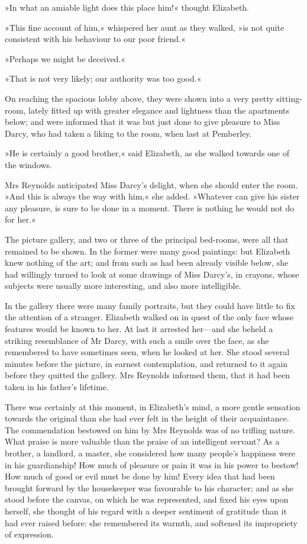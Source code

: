 »In what an amiable light does this place him!« thought Elizabeth.

»This fine account of him,« whispered her aunt as they walked, »is not quite consistent with his behaviour to our poor friend.«

»Perhaps we might be deceived.«

»That is not very likely; our authority was too good.«

On reaching the spacious lobby above, they were shown into a very pretty sitting-room, lately fitted up with greater elegance and lightness than the apartments below; and were informed that it was but just done to give pleasure to Miss Darcy, who had taken a liking to the room, when last at Pemberley.

»He is certainly a good brother,« said Elizabeth, as she walked towards one of the windows.

Mrs Reynolds anticipated Miss Darcy's delight, when she should enter the room. »And this is always the way with him,« she added. »Whatever can give his sister any pleasure, is sure to be done in a moment. There is nothing he would not do for her.«

The picture gallery, and two or three of the principal bed-rooms, were all that remained to be shown. In the former were many good paintings: but Elizabeth knew nothing of the art; and from such as had been already visible below, she had willingly turned to look at some drawings of Miss Darcy's, in crayons, whose subjects were usually more interesting, and also more intelligible.

In the gallery there were many family portraits, but they could have little to fix the attention of a stranger. Elizabeth walked on in quest of the only face whose features would be known to her. At last it arrested her—and she beheld a striking resemblance of Mr Darcy, with such a smile over the face, as she remembered to have sometimes seen, when he looked at her. She stood several minutes before the picture, in earnest contemplation, and returned to it again before they quitted the gallery. Mrs Reynolds informed them, that it had been taken in his father's lifetime.

There was certainly at this moment, in Elizabeth's mind, a more gentle sensation towards the original than she had ever felt in the height of their acquaintance. The commendation bestowed on him by Mrs Reynolds was of no trifling nature. What praise is more valuable than the praise of an intelligent servant? As a brother, a landlord, a master, she considered how many people's happiness were in his guardianship! How much of pleasure or pain it was in his power to bestow! How much of good or evil must be done by him! Every idea that had been brought forward by the housekeeper was favourable to his character; and as she stood before the canvas, on which he was represented, and fixed his eyes upon herself, she thought of his regard with a deeper sentiment of gratitude than it had ever raised before: she remembered its warmth, and softened its impropriety of expression.


